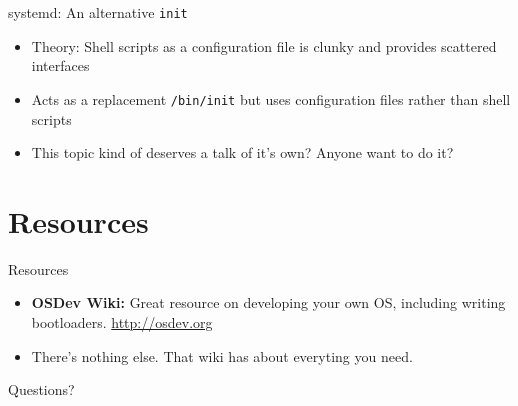 \documentclass{lug}
\begin{document}
\begin{frame}{systemd: An alternative \texttt{init}}
    \begin{itemize}[<+->]
        \item Theory: Shell scripts as a configuration file is clunky and
            provides scattered interfaces
        \item Acts as a replacement \texttt{/bin/init} but uses configuration
            files rather than shell scripts
        \item This topic kind of deserves a talk of it's own? Anyone want to do
            it?
    \end{itemize}
\end{frame}

\section{Resources}

\begin{frame}{Resources}
    \begin{itemize}[<+->]
        \item \textbf{OSDev Wiki:} Great resource on developing your own OS,
            including writing bootloaders. \url{http://osdev.org}
        \item There's nothing else. That wiki has about everyting you need.
    \end{itemize}
\end{frame}

\begin{frame}[standout]
    \Huge
    Questions?
\end{frame}
\end{document}
